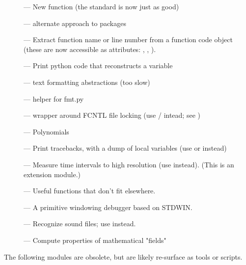 \begin{description}
\item[]
--- New  function (the standard  is
now just as good)

\item[]
--- alternate approach to packages

\item[]
--- Extract function name or line number from a function
code object (these are now accessible as attributes:
, ,
).

\item[]
--- Print python code that reconstructs a variable

\item[]
--- text formatting abstractions (too slow)

\item[]
--- helper for fmt.py

\item[]
--- wrapper around FCNTL file locking (use
/ intead; see )

\item[]
--- Polynomials

\item[]
--- Print tracebacks, with a dump of local variables (use
 or  instead)

\item[]
--- Measure time intervals to high resolution (use
 instead).  (This is an extension module.)

\item[]
--- Useful functions that don't fit elsewhere.

\item[]
--- A primitive windowing debugger based on STDWIN.

\item[]
--- Recognize sound files; use  instead.

\item[]
--- Compute properties of mathematical "fields"
\end{description}


The following modules are obsolete, but are likely re-surface as tools
or scripts.

